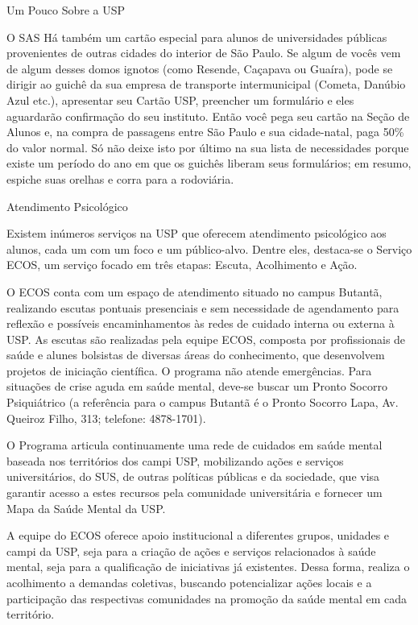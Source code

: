 \begin{secao}{Um Pouco Sobre a USP}
\begin{subsecao}{O SAS}
Há também um cartão especial para alunos de universidades públicas provenientes
de outras cidades do interior de São Paulo. Se algum de vocês vem de algum desses domos
ignotos (como Resende, Caçapava ou Guaíra), pode se dirigir ao guichê da sua empresa de
transporte intermunicipal (Cometa, Danúbio Azul etc.), apresentar seu Cartão USP,
preencher um formulário e eles aguardarão confirmação do seu instituto. Então
você pega seu cartão na Seção de Alunos e, na compra de passagens entre São Paulo
e sua cidade-natal, paga 50\% do valor normal. Só não deixe isto por último na
sua lista de necessidades porque existe um período do ano em que os guichês
liberam seus formulários; em resumo, espiche suas orelhas e corra para a rodoviária.

\end{subsecao}

\begin{subsecao}{Atendimento Psicológico}

Existem inúmeros serviços na USP que oferecem atendimento psicológico
aos alunos, cada um com um foco e um público-alvo. Dentre eles, destaca-se
o Serviço ECOS, um serviço focado em três etapas: Escuta, Acolhimento e Ação.

O ECOS conta com um espaço de atendimento situado no campus Butantã, realizando 
escutas pontuais presenciais e sem necessidade de agendamento para reflexão e possíveis 
encaminhamentos às redes de cuidado interna ou externa à USP. As escutas são realizadas 
pela equipe ECOS, composta por profissionais de saúde e alunes bolsistas de diversas áreas 
do conhecimento, que desenvolvem projetos de iniciação científica. O programa não atende
emergências. Para situações de crise aguda em saúde mental, deve-se buscar um Pronto Socorro 
Psiquiátrico (a referência para o campus Butantã é o Pronto Socorro Lapa, Av. Queiroz Filho, 
313; telefone: 4878-1701).

O Programa articula continuamente uma rede de cuidados em saúde mental baseada nos
territórios dos campi USP, mobilizando ações e serviços universitários, do SUS, de 
outras políticas públicas e da sociedade, que visa garantir acesso a estes recursos 
pela comunidade universitária e fornecer um Mapa da Saúde Mental da USP.

A equipe do ECOS oferece apoio institucional a diferentes grupos, unidades e campi da 
USP, seja para a criação de ações e serviços relacionados à saúde mental, seja para a 
qualificação de iniciativas já existentes. Dessa forma, realiza o acolhimento a demandas 
coletivas, buscando potencializar ações locais e a participação das respectivas comunidades 
na promoção da saúde mental em cada território.


\end{subsecao}
\end{secao}
